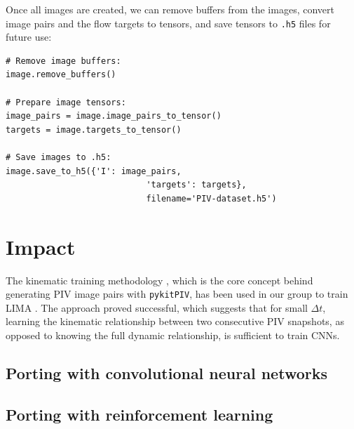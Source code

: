 \documentclass[a4paper,fleqn]{cas-dc}
\newcommand{ \kamila}[1]{\color{blue}{Kamila: #1} \color{black}}
\begin{document}
Once all images are created, we can remove buffers from the images, convert image pairs and the flow targets to tensors, and save tensors to \texttt{.h5} files for future use:
\lstset{language=Python}
\begin{lstlisting}
# Remove image buffers:
image.remove_buffers()

# Prepare image tensors:
image_pairs = image.image_pairs_to_tensor()
targets = image.targets_to_tensor()

# Save images to .h5:
image.save_to_h5({'I': image_pairs, 
							'targets': targets}, 
							filename='PIV-dataset.h5')
\end{lstlisting}

\section{Impact} \label{sec:results}

The kinematic training methodology \cite{manickathan2022kinematic}, which is the core concept behind generating PIV image pairs with \texttt{pykitPIV}, has been used in our group to train LIMA \cite{manickathan2023lightweight, mucignat2023lightweight}. The approach proved successful, which suggests that for small $\Delta t$, learning the kinematic relationship between two consecutive PIV snapshots, as opposed to knowing the full dynamic relationship, is sufficient to train CNNs.




\kamila{It would be great if we could extend image generation to synthetic event-based camera datasets. This would make the software truly novel.}

\kamila{Perhaps a nice novelty would be to allow the user to add solid boundaries into the image?}


\subsection{Porting with convolutional neural networks}

\kamila{Here we can describe what can be achieved in terms of training a CNN.}

\subsection{Porting with reinforcement learning}

\kamila{Here we can describe what can be achieved in terms of training an RL agent, e.g. in the context of autonomous experimentation. Maybe the agent will learn to augment the dataset in real time to account for a changing experimental settings.}
\end{document}
